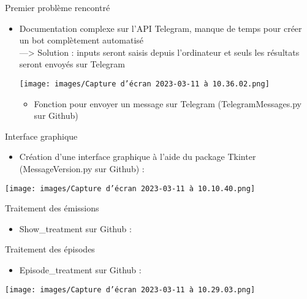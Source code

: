 \documentclass[
  ignorenonframetext,
]{beamer}
\providecommand{\tightlist}{%
  \setlength{\itemsep}{0pt}\setlength{\parskip}{0pt}}
\begin{document}
\begin{frame}{Premier problème rencontré}
\protect\hypertarget{premier-probluxe8me-rencontruxe9}{}
\begin{itemize}
\item
  Documentation complexe sur l'API Telegram, manque de temps pour créer
  un bot complètement automatisé\\
  ---\textgreater{} Solution : inputs seront saisis depuis l'ordinateur
  et seuls les résultats seront envoyés sur Telegram

  \texttt{[image: images/Capture d’écran 2023-03-11 à 10.36.02.png]}

  \begin{itemize}
  \tightlist
  \item
    Fonction pour envoyer un message sur Telegram (TelegramMessages.py
    sur Github)
  \end{itemize}
\end{itemize}
\end{frame}

\begin{frame}{Interface graphique}
\protect\hypertarget{interface-graphique}{}
\begin{itemize}
\tightlist
\item
  Création d'une interface graphique à l'aide du package Tkinter
  (MessageVersion.py sur Github) :
\end{itemize}

\texttt{[image: images/Capture d’écran 2023-03-11 à 10.10.40.png]}
\end{frame}

\begin{frame}{Traitement des émissions}
\protect\hypertarget{traitement-des-uxe9missions}{}
\begin{itemize}
\tightlist
\item
  Show\_treatment sur Github :
\end{itemize}
\end{frame}

\begin{frame}{Traitement des épisodes}
\protect\hypertarget{traitement-des-uxe9pisodes}{}
\begin{itemize}
\tightlist
\item
  Episode\_treatment sur Github :
\end{itemize}

\texttt{[image: images/Capture d’écran 2023-03-11 à 10.29.03.png]}
\end{frame}
\end{document}
